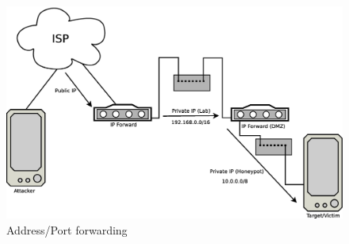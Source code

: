 \begin{figure}[h]
\begin{center}
	\includegraphics[scale=0.25]{Images/Forward.eps}
\caption{Address/Port forwarding}
\label{fig:Forward}
\end{center}
\end{figure}

